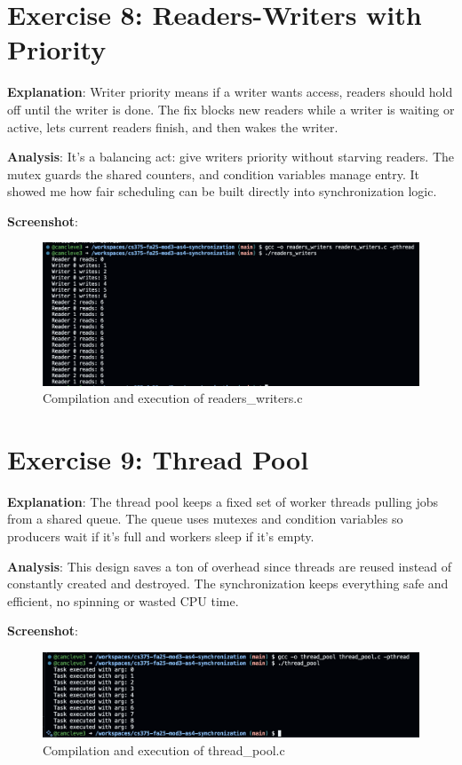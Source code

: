 \documentclass{article}
\begin{document}
\section{Exercise 8: Readers-Writers with Priority}


\textbf{Explanation}:  
Writer priority means if a writer wants access, readers should hold off until the writer is done. The fix blocks new readers while a writer is waiting or active, lets current readers finish, and then wakes the writer.

\textbf{Analysis}:  
It’s a balancing act: give writers priority without starving readers. The mutex guards the shared counters, and condition variables manage entry. It showed me how fair scheduling can be built directly into synchronization logic.

\textbf{Screenshot}:
\begin{figure}[h]
  \centering
  \includegraphics[width=\textwidth]{pic8.png}
  \caption{Compilation and execution of readers\_writers.c}
\end{figure}

\section{Exercise 9: Thread Pool}


\textbf{Explanation}:  
The thread pool keeps a fixed set of worker threads pulling jobs from a shared queue. The queue uses mutexes and condition variables so producers wait if it’s full and workers sleep if it’s empty.

\textbf{Analysis}:  
This design saves a ton of overhead since threads are reused instead of constantly created and destroyed. The synchronization keeps everything safe and efficient, no spinning or wasted CPU time.

\textbf{Screenshot}:
\begin{figure}[h]
  \centering
  \includegraphics[width=\textwidth]{pic9.png}
  \caption{Compilation and execution of thread\_pool.c}
\end{figure}
\end{document}
